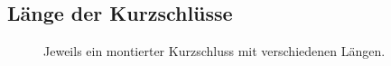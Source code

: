 \subsection{L\"ange der Kurzschl\"usse}

\begin{figure}[htb]
	\centering
	\hspace{0.05\textwidth}
	\hspace{0.05\textwidth}
	\caption{Jeweils ein montierter Kurzschluss mit verschiedenen L\"angen.}
	\label{fig:ringcoreheigthCST}
\end{figure}